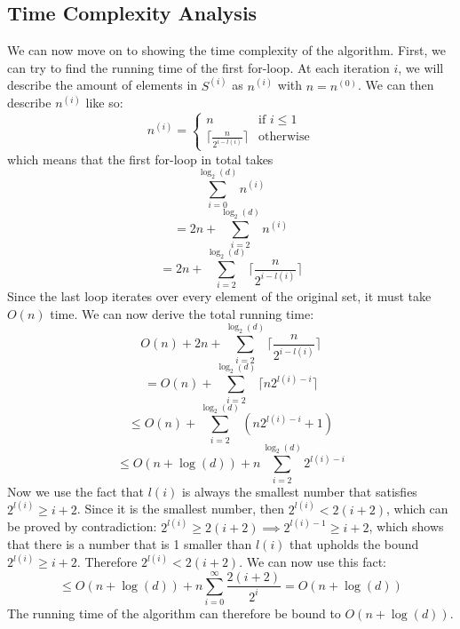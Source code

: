 \subsection{Time Complexity Analysis}
We can now move on to showing the time complexity of the algorithm. 
First, we can try to find the running time of the first for-loop. At each iteration $i$, we will describe the amount of elements in $S^{(i)}$ as $n^{(i)}$ with $n=n^{(0)}$. We can then describe $n^{(i)}$ like so:
\begin{equation}
    n^{(i)}=
    \begin{cases}
        n & \textrm{if } i \leq 1  \\
        \lceil \frac{n}{2^{i-l(i)}} \rceil & \textrm{otherwise}
    \end{cases}
\end{equation}
which means that the first for-loop in total takes
$$\sum_{i=0}^{\log_2{(d)}}n^{(i)}$$
$$=2n+\sum_{i=2}^{\log_2{(d)}} n^{(i)}$$
$$=2n + \sum_{i=2}^{\log_2(d)}\lceil \frac{n}{2^{i-l(i)}} \rceil$$
Since the last loop iterates over every element of the original set, it must take $O(n)$ time. We can now derive the total running time:
$$O(n) + 2n + \sum_{i=2}^{\log_2(d)}\lceil \frac{n}{2^{i-l(i)}} \rceil$$
$$=O(n) + \sum_{i=2}^{\log_2(d)}\lceil n2^{l(i)-i} \rceil$$
$$\leq O(n) + \sum_{i=2}^{\log_2(d)}(n2^{l(i)-i} + 1)$$
$$\leq O(n + \log(d)) + n\sum_{i=2}^{\log_2(d)}2^{l(i)-i}$$
Now we use the fact that $l(i)$ is always the smallest number that satisfies $2^{l(i)} \geq i + 2$. Since it is the smallest number, then $2^{l(i)} < 2(i+2)$, which can be proved by contradiction: $2^{l(i)} \geq 2(i+2) \implies 2^{l(i)-1} \geq i+2$, which shows that there is a number that is 1 smaller than $l(i)$ that upholds the bound $2^{l(i)} \geq i + 2$. Therefore $2^{l(i)} < 2(i+2)$. We can now use this fact:
$$\leq O(n + \log(d)) + n\sum_{i=0}^{\infty}\frac{2(i+2)}{2^{i}} = O(n+\log(d))$$
The running time of the algorithm can therefore be bound to $O(n + \log(d))$.
